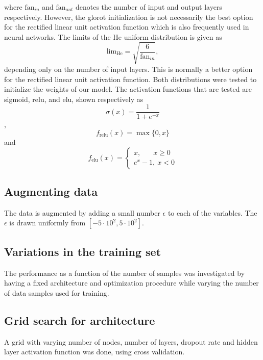 \documentclass[prl,twocolumn]{revtex4-1}
\begin{document}
where $\textrm{fan}_{in}$ and $\textrm{fan}_{out}$ denotes the number of input and output layers respectively. However, the glorot initialization is not necessarily the best option for the rectified linear unit activation function which is also frequently used in neural networks. The limits of the He uniform distribution is given as
\begin{equation}
    \textrm{lim}_\textrm{He} = \sqrt{\frac{6}{\textrm{fan}_{in}}},
\end{equation}
depending only on the number of input layers. This is normally a better option for the rectified linear unit activation function. Both distributions were tested to initialize the weights of our model. The activation functions that are tested are sigmoid, relu, and elu, shown respectively as
\begin{equation}
    \sigma(x) = \frac{1}{1+e^{-x}}
    \label{eq:sigmoid}
\end{equation},
\begin{equation}
    f_\textrm{relu}(x) = \max \{0,x\}
    \label{eq:relu}
\end{equation} 
and 
\begin{equation}
    f_\textrm{elu}(x) = \begin{cases}
    x, \ \ \ \ \ \ \ \, x \geq 0\\
    e^x -1, \ x < 0
    \end{cases}
    \label{eq:elu}
\end{equation}


\subsection{Augmenting data}
The data is augmented by adding a small number $\epsilon$ to each of the variables. The $\epsilon$ is drawn uniformly from $[-5\cdot10^2,5\cdot10^2]$.


\subsection{Variations in the training set}
The performance as a function of the number of samples was investigated by having a fixed architecture and optimization procedure while varying the number of data samples used for training. 

\subsection{Grid search for architecture}
A grid with varying number of nodes, number of layers, dropout rate and hidden layer activation function was done, using cross validation.  
\end{document}

